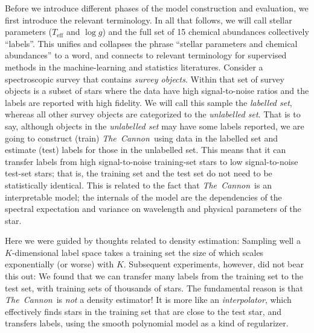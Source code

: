 \documentclass[12pt,preprint]{aastex}
\newcommand{\project}[1]{\textsl{#1}}
\newcommand{\TheCannon}{\project{The~Cannon}}
\newcommand{\logg}{\log g}
\newcommand{\Teff}{T_{\mathrm{eff}}}
\begin{document}


Before we introduce different phases of the model 
construction and evaluation, we first introduce the relevant terminology.
In all that follows, we will call stellar parameters ($\Teff$ and
$\logg$) and the full set of 15 chemical abundances
collectively ``labels''.
This unifies and collapses the phrase ``stellar parameters and chemical
abundances'' to a word, and connects to relevant terminology
for supervised methods in the machine-learning and statistics
literatures.  Consider a spectroscopic survey that contains \emph{survey objects}.
Within that set of survey objects is a subset of stars where the
data have high signal-to-noise ratios and the labels are reported
with high fidelity.  We will call this sample the \emph{labelled set},
whereas all other survey objects are categorized to the \emph{unlabelled set}. That is to say,
although objects in the \emph{unlabelled set} may have some labels reported, we are going to construct (train) 
\TheCannon\ using data in the labelled set and estimate (test) labels for those in the unlabelled set.
This means that it can transfer labels from high signal-to-noise training-set
stars to low signal-to-noise test-set stars; that is, the training set and 
the test set do not need to be statistically identical. This is related to the fact that \TheCannon\ is an interpretable model;
the internals of the model are the dependencies of the spectral expectation
and variance on wavelength and physical parameters of the star.









Here we were guided by thoughts related to density estimation:
Sampling well a $K$-dimensional label space takes a training set the
size of which scales exponentially (or worse) with $K$.
Subsequent experiments, however, did not bear this out:
We found that we can transfer many labels from the training set to
the test set, with training sets of thousands of stars.
The fundamental reason is that \TheCannon\ is \emph{not} a density estimator!
It is more like an \emph{interpolator}, which effectively finds stars in
the training set that are close to the test star, and transfers labels,
using the smooth polynomial model as a kind of regularizer.
\end{document}
